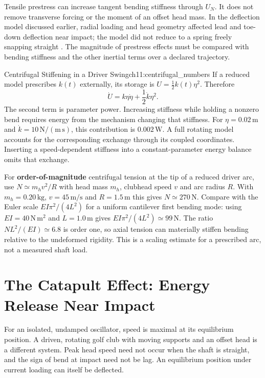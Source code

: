Tensile prestress can increase tangent bending stiffness through $U_N$. It does not remove transverse forcing or the moment of an offset head mass. In the deflection model discussed earlier, radial loading and head geometry affected lead and toe-down deflection near impact; the model did not reduce to a spring freely snapping straight \citep{MacKenzie2010Deflection}. The magnitude of prestress effects must be compared with bending stiffness and the other inertial terms over a declared trajectory.

\begin{example}{Centrifugal Stiffening in a Driver Swing}{ch11:centrifugal_numbers}
If a reduced model prescribes $k(t)$ externally, its storage is $U=\tfrac12k(t)\eta^2$. Therefore
\[
\dot U=k\eta\dot\eta+\frac12\dot k\eta^2.
\]
The second term is parameter power. Increasing stiffness while holding a nonzero bend requires energy from the mechanism changing that stiffness. For $\eta=0.02\,\mathrm m$ and $\dot k=10\,\mathrm{N/(m\,s)}$, this contribution is $0.002\,\mathrm W$. A full rotating model accounts for the corresponding exchange through its coupled coordinates. Inserting a speed-dependent stiffness into a constant-parameter energy balance omits that exchange.

For \textbf{order-of-magnitude} centrifugal tension at the tip of a reduced driver arc, use $N\simeq m_h v^2/R$ with head mass $m_h$, clubhead speed $v$ and arc radius $R$. With $m_h=0.20\,\mathrm{kg}$, $v=45\,\mathrm{m/s}$ and $R=1.5\,\mathrm m$ this gives $N\simeq270\,\mathrm N$. Compare with the Euler scale $EI\pi^2/(4L^2)$ for a uniform cantilever first bending mode: using $EI=40\,\mathrm{N\,m^2}$ and $L=1.0\,\mathrm m$ gives $EI\pi^2/(4L^2)\simeq99\,\mathrm N$. The ratio $NL^2/(EI)\simeq6.8$ is order one, so axial tension can materially stiffen bending relative to the undeformed rigidity. This is a scaling estimate for a prescribed arc, not a measured shaft load.
\end{example}

\section{The Catapult Effect: Energy Release Near Impact}
For an isolated, undamped oscillator, speed is maximal at its equilibrium position. A driven, rotating golf club with moving supports and an offset head is a different system. Peak head speed need not occur when the shaft is straight, and the sign of bend at impact need not be lag. An equilibrium position under current loading can itself be deflected.

